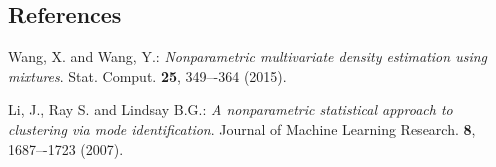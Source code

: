 \documentclass[12pt]{article}
\begin{document}
%        
%
%        

\subsection*{References}

\begin{description}

\item
Wang, X. and Wang, Y.:
\textit{Nonparametric multivariate density estimation using mixtures}.
Stat. Comput. \textbf{25}, 349–-364 (2015).

\item
Li, J., Ray S. and Lindsay B.G.:
\textit{A nonparametric statistical approach to clustering via mode identification}.
Journal of Machine Learning Research. \textbf{8}, 1687–-1723 (2007).



\end{description}
\end{document}
